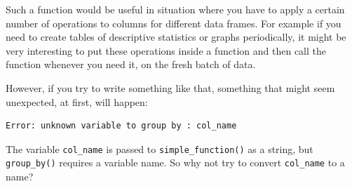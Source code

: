\documentclass[]{gitbook}
\newenvironment{Shaded}{\begin{snugshade}}{\end{snugshade}}
\newcommand{\ControlFlowTok}[1]{\textcolor[rgb]{0.13,0.29,0.53}{\textbf{#1}}}
\newcommand{\DataTypeTok}[1]{\textcolor[rgb]{0.13,0.29,0.53}{#1}}
\newcommand{\KeywordTok}[1]{\textcolor[rgb]{0.13,0.29,0.53}{\textbf{#1}}}
\newcommand{\NormalTok}[1]{#1}
\newcommand{\OperatorTok}[1]{\textcolor[rgb]{0.81,0.36,0.00}{\textbf{#1}}}
\newcommand{\StringTok}[1]{\textcolor[rgb]{0.31,0.60,0.02}{#1}}
\theoremstyle{definition}
\theoremstyle{definition}
\theoremstyle{definition}
\theoremstyle{remark}
\begin{document}
Such a function would be useful in situation where you have to apply a
certain number of operations to columns for different data frames. For
example if you need to create tables of descriptive statistics or graphs
periodically, it might be very interesting to put these operations
inside a function and then call the function whenever you need it, on
the fresh batch of data.

However, if you try to write something like that, something that might
seem unexpected, at first, will happen:

\begin{Shaded}
\end{Shaded}

\begin{verbatim}
Error: unknown variable to group by : col_name
\end{verbatim}

The variable \texttt{col\_name} is passed to \texttt{simple\_function()}
as a string, but \texttt{group\_by()} requires a variable name. So why
not try to convert \texttt{col\_name} to a name?

\begin{Shaded}
\end{Shaded}
\end{document}
